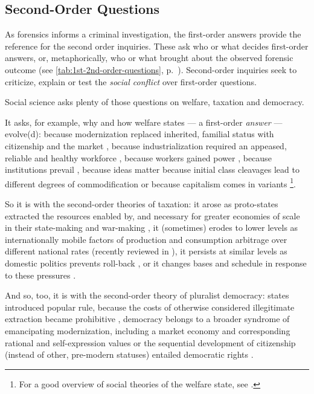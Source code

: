 \subsection{Second-Order Questions \label{sec:2nd-questions}}
As forensics informs a criminal investigation, the first-order answers provide the reference for the second order inquiries.
These ask who or what decides first-order answers, or, metaphorically, who or what brought about the observed forensic outcome (see \autoref{tab:1st-2nd-order-questions}, p.~\pageref{tab:1st-2nd-order-questions}).
Second-order inquiries seek to criticize, explain or test the \emph{social conflict} over first-order questions.

Social science asks plenty of those questions on welfare, taxation and democracy.

It asks, for example, why and how welfare states --- a first-order \emph{answer} --- evolve(d): because modernization replaced inherited, familial status with citizenship and the market \citep{Titmuss1974,Marshall-1950-aa}, because industrialization required an appeased, reliable and healthy workforce \citep{Flora1981,Wilensky1975}, because workers gained power \citep{Korpi1983,Jessop2002}, because institutions prevail \citep[for example,][]{Rothstein}, because ideas matter \citep[for example,][]{Stiller2009} because initial class cleavages lead to different degrees of commodification \citep{Esping-Andersen-1990-aa} or because capitalism comes in variants \citep{HallSoskice-2001-aa}
\footnote{
	For a good overview of social theories of the welfare state, see \cite{BrooksManza2007} %
	.
}.

So it is with the second-order theories of taxation: it arose as proto-states extracted the resources enabled by, and necessary for greater economies of scale in their state-making and war-making \citep{Tilly-1985-aa}, it (sometimes) erodes to lower levels as internationally mobile factors of production and consumption arbitrage over different national rates (recently reviewed in \citealt{Genschel2010}), it persists at similar levels as domestic politics prevents roll-back \citep{Swank2002}, or it changes bases and schedule in response to these pressures \citep{Kemmerling2009}.  %

And so, too, it is with the second-order theory of pluralist democracy: states introduced popular rule, because the costs of otherwise considered illegitimate extraction became prohibitive \citep{Tilly2006}, democracy belongs to a broader syndrome of emancipating modernization, including a market economy and corresponding rational and self-expression values \citep{InglehartWelzel-2005-aa} or the sequential development of citizenship (instead of other, pre-modern statuses) entailed democratic rights \citep{Marshall-1950-aa}. %

